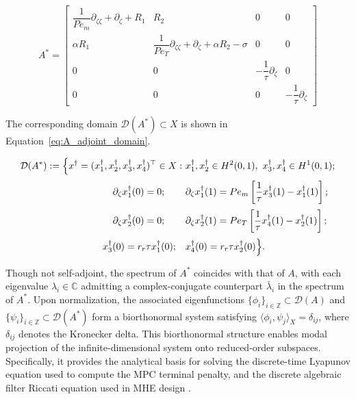 \begin{equation} \label{eq:A_adjoint}
A^* =
\begin{bmatrix} 
\dfrac{1}{Pe_m} \partial_{\zeta \zeta} + \partial_\zeta + R_1 & R_2 & 0 & 0 \\
\alpha R_1 & \dfrac{1}{Pe_T} \partial_{\zeta \zeta} + \partial_\zeta + \alpha R_2 - \sigma & 0 & 0 \\
0 & 0 & -\dfrac{1}{\tau} \partial_\zeta & 0 \\
0 & 0 & 0 & -\dfrac{1}{\tau} \partial_\zeta
\end{bmatrix}
\end{equation}

The corresponding domain $\mathcal{D}(A^*) \subset X$ is shown in Equation~\eqref{eq:A_adjoint_domain}.

\begin{equation} \label{eq:A_adjoint_domain}
\begin{aligned}
\mathcal{D}(A^*) := \Big\{ x^\dagger = (x_1^\dagger, x_2^\dagger, x_3^\dagger, x_4^\dagger)^\top \in X :\ 
& x_1^\dagger, x_2^\dagger \in H^2(0,1),\ x_3^\dagger, x_4^\dagger \in H^1(0,1); \\[0.5ex]
\partial_\zeta x_1^\dagger(0) = 0; \hspace{2.2em} & \partial_\zeta x_1^\dagger(1) = Pe_m \left[ \frac{1}{\tau} x_3^\dagger(1) - x_1^\dagger(1) \right]; \\[0.5ex]
\partial_\zeta x_2^\dagger(0) = 0; \hspace{2.2em} & \partial_\zeta x_2^\dagger(1) = Pe_T \left[ \frac{1}{\tau} x_4^\dagger(1) - x_2^\dagger(1) \right]; \\[0.5ex]
x_3^\dagger(0) = r_r \tau x_1^\dagger(0); \quad & x_4^\dagger(0) = r_r \tau x_2^\dagger(0)
\Big\}.
\end{aligned}
\end{equation}


Though not self-adjoint, the spectrum of $A^*$ coincides with that of $A$, with each eigenvalue $\lambda_i \in \mathbb{C}$ admitting a complex-conjugate counterpart $\bar{\lambda}_i$ in the spectrum of $A^* $. Upon normalization, the associated eigenfunctions $\{ \phi_i \}_{i \in \mathbb{Z}} \subset \mathcal{D}(A)$ and $\{ \psi_i \}_{i \in \mathbb{Z}} \subset \mathcal{D}(A^*)$ form a biorthonormal system satisfying $\langle \phi_i, \psi_j \rangle_X = \delta_{ij}$, where $\delta_{ij}$ denotes the Kronecker delta. This biorthonormal structure enables modal projection of the infinite-dimensional system onto reduced-order subspaces. Specifically, it provides the analytical basis for solving the discrete-time Lyapunov equation used to compute the MPC terminal penalty, and the discrete algebraic filter Riccati equation used in MHE design \autocite{moadeli2025optimal, Khatibi2021Model, xie2022constrained}.

